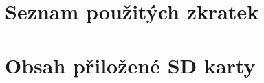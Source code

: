 \documentclass[thesis=B,czech,hidelinks]{dependencies/Thesis}
\begin{document}

\renewcommand{\thefigure}{\arabic{chapter}.\arabic{figure}}
\renewcommand{\figurename}{Obrázek}

\renewcommand{\thetable}{\arabic{chapter}.\arabic{table}}
\renewcommand{\tablename}{Tabulka}

\renewcommand{\thelisting}{\arabic{chapter}.\arabic{listing}}



\begin{introduction}
   \listoftodos
   
\end{introduction}










\begin{conclusion}
   
\end{conclusion}

\begin{literature}
   \printbibliography[heading=none]
\end{literature}



\appendix

\chapter{Seznam použitých zkratek}
\printglossary[type=\acronymtype,style=acronyms]

\chapter{Obsah přiložené SD karty}


\end{document}
